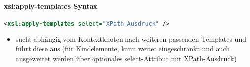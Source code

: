 \paragraph{xsl:apply-templates Syntax}\hspace{1mm}
\begin{lstlisting}[caption={xsl:apply-templates Syntax}, label={lst:xsl:apply-templates}, language={XML}]
<xsl:apply-templates select="XPath-Ausdruck" />
\end{lstlisting}
\begin{itemize}
\item sucht abhängig vom Kontextknoten nach weiteren passenden Templates und führt diese aus (für Kindelemente, kann weiter eingeschränkt und auch ausgeweitet werden über optionales select-Attribut mit XPath-Ausdruck)
\end{itemize}